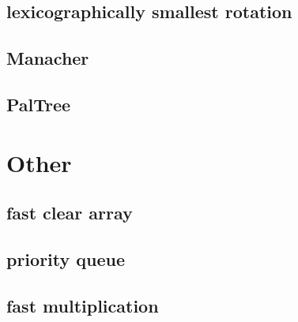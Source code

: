 \documentclass[a4paper,10pt,twocolumn,oneside]{article}
\begin{document}
\subsection{lexicographically smallest rotation}

\subsection{Manacher}

\subsection{PalTree}


\section{Other}
\subsection{fast clear array}

\subsection{priority queue}

\subsection{fast multiplication}

\end{document}
